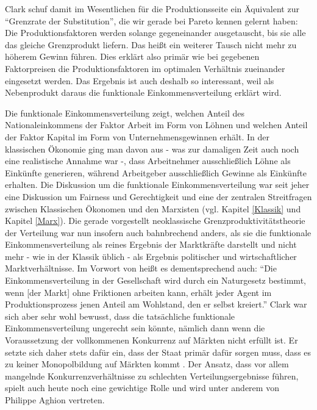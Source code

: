 Clark schuf damit im Wesentlichen für die Produktionsseite ein Äquivalent zur "`Grenzrate der Substitution"', die wir gerade bei Pareto kennen gelernt haben: Die Produktionsfaktoren werden solange gegeneinander ausgetauscht, bis sie alle das gleiche Grenzprodukt liefern. Das heißt ein weiterer Tausch nicht mehr zu höherem Gewinn führen. Dies erklärt also primär wie bei gegebenen Faktorpreisen die Produktionsfaktoren im optimalen Verhältnis zueinander eingesetzt werden. Das Ergebnis ist auch deshalb so interessant, weil als Nebenprodukt daraus die funktionale Einkommensverteilung erklärt wird.

Die funktionale Einkommensverteilung zeigt, welchen Anteil des Nationaleinkommens der Faktor Arbeit im Form von Löhnen und welchen Anteil der Faktor Kapital im Form von Unternehmensgewinnen erhält. In der klassischen Ökonomie ging man davon aus - was zur damaligen Zeit auch noch eine realistische Annahme war -, dass Arbeitnehmer ausschließlich Löhne als Einkünfte generieren, während Arbeitgeber ausschließlich Gewinne als Einkünfte erhalten. Die Diskussion um die funktionale Einkommensverteilung war seit jeher eine Diskussion um Fairness und Gerechtigkeit und eine der zentralen Streitfragen zwischen Klassischen Ökonomen und den Marxisten (vgl. Kapitel \ref{Klassik} und Kapitel \ref{Marx}). Die gerade vorgestellt neoklassische Grenzproduktivitätstheorie der Verteilung war nun insofern auch bahnbrechend anders, als sie die funktionale Einkommensverteilung als reines Ergebnis der Marktkräfte darstellt und nicht mehr - wie in der Klassik üblich - als Ergebnis politischer und wirtschaftlicher Marktverhältnisse. Im Vorwort von \textcite{Clark1899} heißt es dementsprechend auch: "`Die Einkommensverteilung in der Gesellschaft wird durch ein Naturgesetz bestimmt, wenn [der Markt] ohne Friktionen arbeiten kann, erhält jeder Agent im Produktionsprozess jenen Anteil am Wohlstand, den er selbst kreiert."' Clark war sich aber sehr wohl bewusst, dass die tatsächliche funktionale Einkommensverteilung ungerecht sein könnte, nämlich dann wenn die Voraussetzung der vollkommenen Konkurrenz auf Märkten nicht erfüllt ist. Er setzte sich daher stets dafür ein, dass der Staat primär dafür sorgen muss, dass es zu keiner Monopolbildung auf Märkten kommt \parencite{Clark1907}. Der Ansatz, dass vor allem mangelnde Konkurrenzverhältnisse zu schlechten Verteilungsergebnisse führen, spielt auch heute noch eine gewichtige Rolle und wird unter anderem von Philippe Aghion vertreten.

